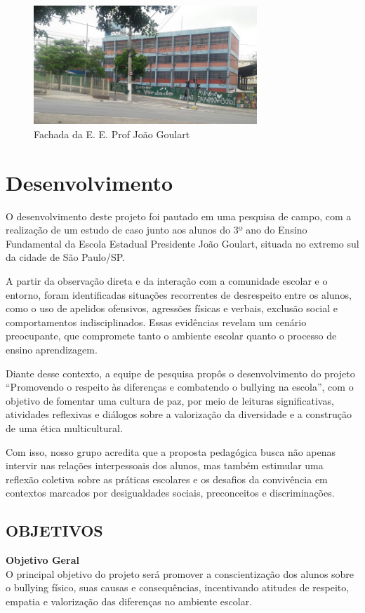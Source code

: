 \begin{figure}
	\centering
	\includegraphics[width=0.75\textwidth]{fachada1.jpg}
	\caption{Fachada da E. E. Prof João Goulart}
	\label{fig:fachada_escola}
\end{figure}

\chapter{Desenvolvimento}
O desenvolvimento deste projeto foi pautado em uma pesquisa de campo, com a realização de um estudo de caso junto aos alunos do 3º ano do Ensino Fundamental da Escola Estadual Presidente João Goulart, situada no extremo sul da cidade de São Paulo/SP. 

A partir da observação direta e da interação com a comunidade escolar e o entorno, foram identificadas situações recorrentes de desrespeito entre os alunos, como o uso de apelidos ofensivos, agressões físicas e verbais, exclusão social e comportamentos indisciplinados. Essas evidências revelam um cenário preocupante, que compromete tanto o ambiente escolar quanto o processo de ensino aprendizagem. 

Diante desse contexto, a equipe de pesquisa propôs o desenvolvimento do projeto “Promovendo o respeito às diferenças e combatendo o bullying na escola”, com o objetivo de fomentar uma cultura de paz, por meio de leituras significativas, atividades reflexivas e diálogos sobre a valorização da diversidade e a construção de uma ética multicultural. 

Com isso, nosso grupo acredita que a proposta pedagógica busca não apenas intervir nas relações interpessoais dos alunos, mas também estimular uma reflexão coletiva sobre as práticas escolares e os desafios da convivência em contextos marcados por desigualdades sociais, preconceitos e discriminações. 

\section{OBJETIVOS}
\textbf{Objetivo Geral}\\
O principal objetivo do projeto será promover a conscientização dos alunos sobre o bullying físico, suas causas e consequências, incentivando atitudes de respeito, empatia e valorização das diferenças no ambiente escolar. 

